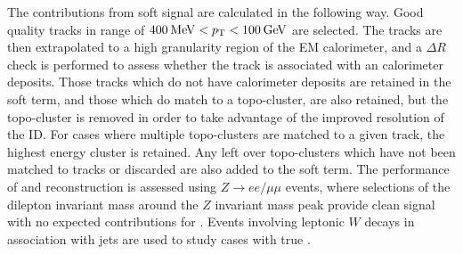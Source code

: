 The contributions from soft signal are calculated in the following way. Good quality tracks in \pt range of $400\hspace{2pt}\text{Me\kern -0.1em V}<p_{\text{T}}<100\hspace{2pt}\text{Ge\kern -0.1em V}$ are selected. The tracks are then extrapolated to a high granularity region of the EM calorimeter, and a $\Delta R$ check is performed to assess whether the track is associated with an calorimeter deposits. Those tracks which do not have calorimeter deposits are retained in the soft term, and those which do match to a topo-cluster, are also retained, but the topo-cluster is removed in order to take advantage of the improved \pt resolution of the ID. For cases where multiple topo-clusters are matched to a given track, the highest energy cluster is retained. Any left over topo-clusters which have not been matched to tracks or discarded are also added to the soft term. The performance of \met and \ptmiss reconstruction is assessed using $Z\rightarrow ee/\mu\mu$ events, where selections of the dilepton invariant mass around the $Z$ invariant mass peak provide clean signal with no expected contributions for \met. Events involving leptonic $W$ decays in association with jets are used to study cases with true \MET \cite{Buckley:PCP,Atlas:met}. %


